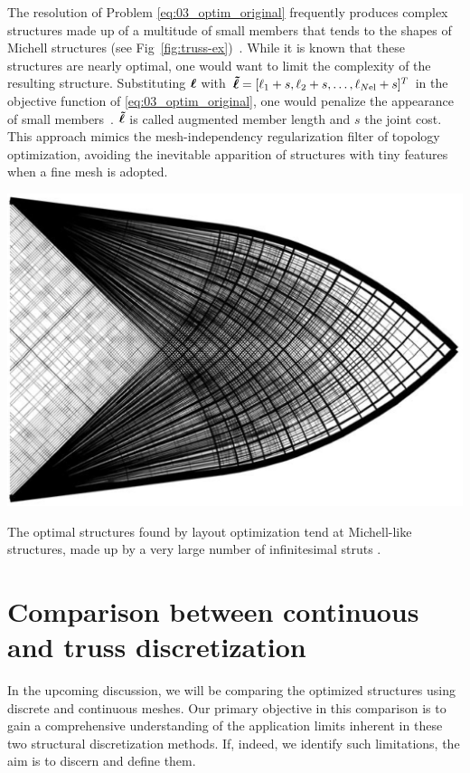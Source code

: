 The resolution of Problem \ref{eq:03_optim_original} frequently produces complex structures made up of a multitude of small members that tends to the shapes of Michell structures (see Fig~\ref{fig:truss-ex})~. While it is known that these structures are nearly optimal, one would want to limit the complexity of the resulting structure. Substituting $\bm{\ell}$ with $\bm{\tilde{\ell}} = [\ell_1 + s, \ell_2 + s, \ldots,\ell_{N\text{el}} + s]^T$ in the objective function of \ref{eq:03_optim_original}, one would penalize the appearance of small members~. $\bm{\tilde{\ell}}$ is called augmented member length and $s$ the joint cost. This approach mimics the mesh-independency regularization filter of topology optimization, avoiding the inevitable apparition of structures with tiny features when a fine mesh is adopted.

\begin{marginfigure}
    \centering
    \includegraphics[width=\linewidth]{figures/03_comparison_TO_TTO/truss-ex.png}
    \caption{The optimal structures found by layout optimization tend at Michell-like structures, made up by a very large number of infinitesimal struts \cite{gilbert_layout_2003}.}
    \label{fig:truss-ex}
\end{marginfigure}

\section{Comparison between continuous and truss discretization} \label{sec:03_comparison}
In the upcoming discussion, we will be comparing the optimized structures using discrete and continuous meshes. Our primary objective in this comparison is to gain a comprehensive understanding of the application limits inherent in these two structural discretization methods. If, indeed, we identify such limitations, the aim is to discern and define them. 

